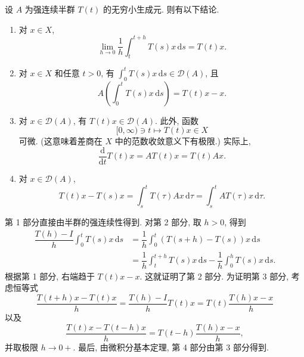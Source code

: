 \begin{Lemma}
\label{lem:semigroup-generator-four-identities}
设 $A$ 为强连续半群 $T(t)$ 的无穷小生成元. 则有以下结论.\begin{enumerate}\item 对 $x\in X$,
\begin{equation}\label{eq:semigroup-local-average-continuity-limit}
\lim_{h\to0}\dfrac{1}{h}\int_t^{t+h}T(s)x\,\mathrm{d}s=T(t)x.
\end{equation}
\item 对 $x\in X$ 和任意 $t>0$, 有 $\int_0^t T(s)x\,\mathrm{d}s\in\mathcal{D}(A)$, 且
\begin{equation}\label{eq:semigroup-integrated-orbit-in-generator-domain}
A\left(\int_0^t T(s)x\,\mathrm{d}s\right)=T(t)x-x.
\end{equation}
\item 对 $x\in\mathcal{D}(A)$, 有 $T(t)x\in\mathcal{D}(A)$. 此外, 函数\[[0,\infty)\ni t\mapsto T(t)x\in X\]可微. (这意味着差商在 $X$ 中的范数收敛意义下有极限.) 实际上,
\begin{equation}\label{eq:semigroup-orbit-generator-differentiation}
\dfrac{\mathrm{d}}{\mathrm{d}t}T(t)x=AT(t)x=T(t)Ax.
\end{equation}
\item 对 $x\in\mathcal{D}(A)$,
\begin{equation}\label{eq:semigroup-generator-orbit-integral-identity}
T(t)x-T(s)x=\int_s^t T(\tau)Ax\,\mathrm{d}\tau=\int_s^t AT(\tau)x\,\mathrm{d}\tau.
\end{equation}
\end{enumerate}
\end{Lemma}

\begin{Proof}
第 1 部分直接由半群的强连续性得到. 对第 2 部分, 取 $h>0$, 得到\[\begin{aligned}
\dfrac{T(h)-I}{h}\int_0^t T(s)x\,\mathrm{d}s&=\dfrac{1}{h}\int_0^t(T(s+h)-T(s))x\,\mathrm{d}s\\
&=\dfrac{1}{h}\int_t^{t+h}T(s)x\,\mathrm{d}s-\dfrac{1}{h}\int_0^h T(s)x\,\mathrm{d}s.
\end{aligned}\]根据第 1 部分, 右端趋于 $T(t)x-x$. 这就证明了第 2 部分. 为证明第 3 部分, 考虑恒等式
\begin{equation}\label{eq:semigroup-orbit-forward-difference-commutation}
\dfrac{T(t+h)x-T(t)x}{h}=\dfrac{T(h)-I}{h}T(t)x=T(t)\dfrac{T(h)x-x}{h}
\end{equation}
以及
\begin{equation}\label{eq:semigroup-orbit-backward-difference-identity}
\dfrac{T(t)x-T(t-h)x}{h}=T(t-h)\dfrac{T(h)x-x}{h},
\end{equation}
并取极限 $h\to0+$. 最后, 由微积分基本定理, 第 4 部分由第 3 部分得到.
\end{Proof}

